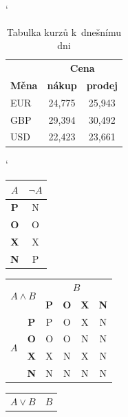 \documentclass[a4paper, 11pt]{article}
\begin{document}
\begin{table}[h]
	\centering
	\catcode`
	\begin{tabular}{|l|c|c|} \hline
	& \multicolumn{2}{c|}{\textbf{Cena}} \\ \cline{2-3}
		\textbf{Měna}  & \textbf{nákup} & \textbf{prodej} \\ \hline
		EUR            & 24,775         & 25,943           \\
		GBP            & 29,394         & 30,492         \\
		USD            & 22,423         & 23,661          \\ \hline
	\end{tabular}
	\caption{Tabulka kurzů k~dnešnímu dni}
    \label{tab:tabulka_kurzov}
\end{table}
\bigskip
\begin{table}[h]
    \centering
    \catcode`
        \begin{tabular}{|c|c|}
            \hline
                $A$ & $\neg A$  \\ \hline
                \textbf{P} & N \\ \hline
                \textbf{O} & O \\ \hline
                \textbf{X} & X \\ \hline
                \textbf{N} & P \\
            \hline
        \end{tabular}
        \begin{tabular}{|c|c|c|c|c|c|}
            \hline
                \multicolumn{2}{|c|}{\multirow{2}{*}{$A \land B$}} & \multicolumn{4}{c|}{$B$} \\
                \cline{3-6}
                \multicolumn{2}{|c|}{} 
                & \textbf{P} & \textbf{O} & \textbf{X} & \textbf{N} \\
                \cline{1-6}
                \multirow{4}{*}{$A$}
                & \textbf{P} & P & O & X & N \\
                \cline{2-6}
                & \textbf{O} & O & O & N & N \\
                \cline{2-6}
                & \textbf{X} & X & N & X & N \\
                \cline{2-6}
                & \textbf{N} & N & N & N & N \\
            \hline
        \end{tabular}
        \begin{tabular}{|c|c|c|c|c|c|}
            \hline
                \multicolumn{2}{|c|}{\multirow{2}{*}{$A \lor B$}} & \multicolumn{4}{c|}{$B$} \\

\end{tabular}
\end{table}
\end{document}
